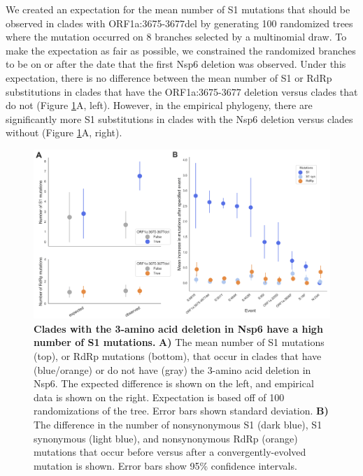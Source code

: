 \documentclass[11pt,oneside,letterpaper]{article}
\begin{document}
We created an expectation for the mean number of S1 mutations that should be observed in clades with ORF1a:3675-3677del by generating 100 randomized trees where the mutation occurred on 8 branches selected by a multinomial draw.
To make the expectation as fair as possible, we constrained the randomized branches to be on or after the date that the first Nsp6 deletion was observed.
Under this expectation, there is no difference between the mean number of S1 or RdRp substitutions in clades that have the ORF1a:3675-3677 deletion versus clades that do not (Figure \ref{fig:nsp6s1}A, left).
However, in the empirical phylogeny, there are significantly more S1 substitutions in clades with the Nsp6 deletion versus clades without (Figure \ref{fig:nsp6s1}A, right).

\begin{figure}[h!]
	\centerline{\includegraphics[width=1.0\textwidth]{fig5_nsp6s1.png}}
	\caption{\textbf{Clades with the 3-amino acid deletion in Nsp6 have a high number of S1 mutations.}
	\textbf{A)} The mean number of S1 mutations (top), or RdRp mutations (bottom), that occur in clades that have (blue/orange) or do not have (gray) the 3-amino acid deletion in Nsp6.
	The expected difference is shown on the left, and empirical data is shown on the right.
	Expectation is based off of 100 randomizations of the tree. Error bars shown standard deviation.
	\textbf{B)} The difference in the number of nonsynonymous S1 (dark blue), S1 synonymous (light blue), and nonsynonymous RdRp (orange) mutations that occur before versus after a convergently-evolved mutation is shown.
	Error bars show 95\% confidence intervals.
	}
	\label{fig:nsp6s1}
\end{figure}
\end{document}
